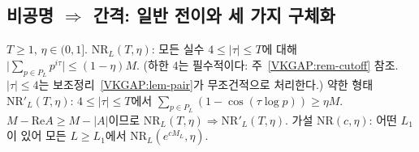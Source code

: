 \subsection{비공명 $\Rightarrow$ 간격: 일반 전이와 세 가지 구체화}
\label{VKGAP:sec-C}

\begin{definition}[비공명]\label{VKGAP:def-NR}
$T\ge1$, $\eta\in(0,1]$. $\mathrm{NR}_L(T,\eta)$: 모든 실수 $4\le|\tau|\le T$에 대해 $\big|\sum_{p\in P_L}p^{i\tau}\big|\le(1-\eta)M$.
(하한 $4$는 필수적이다: 주~\ref{VKGAP:rem-cutoff} 참조. $|\tau|\le4$는 보조정리~\ref{VKGAP:lem-pair}가 무조건적으로 처리한다.)
약한 형태 $\mathrm{NR}'_L(T,\eta)$: $4\le|\tau|\le T$에서 $\sum_{p\in P_L}(1-\cos(\tau\log p))\ge\eta M$.
$M-\mathrm{Re}A\ge M-|A|$이므로 $\mathrm{NR}_L(T,\eta)\Rightarrow\mathrm{NR}'_L(T,\eta)$.
가설 $\mathrm{NR}(c,\eta)$: 어떤 $L_1$이 있어 모든 $L\ge L_1$에서 $\mathrm{NR}_L(e^{cM_L},\eta)$.
\end{definition}


